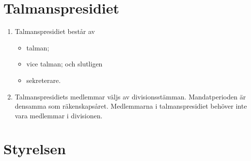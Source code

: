 \documentclass{dvd}
\begin{document}
	\section{Talmanspresidiet}

	\begin{enumerate}[label=\arabic* §, ref=\arabic*]
		\item Talmanspresidiet består av

		\begin{itemize}
			\item talman;
			\item vice talman; och slutligen
			\item sekreterare.
		\end{itemize}

		\item Talmanspresidiets medlemmar väljs av divisionsstämman.
		Mandatperioden är densamma som räkenskapsåret.
		Medlemmarna i talmanspresidiet behöver inte vara medlemmar i divisionen.
	\end{enumerate}

	\section{Styrelsen}
\end{document}

